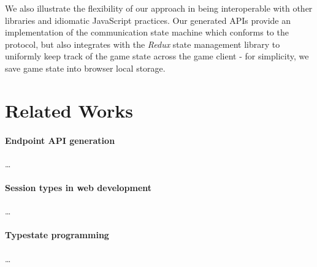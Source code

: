 \documentclass[submission,copyright,creativecommons]{eptcs}
\begin{document}
We also illustrate the flexibility of our approach in being interoperable with other libraries and idiomatic JavaScript practices. Our generated APIs provide an implementation of the communication state machine which conforms to the protocol, but \cite{NoughtsAndCrosses} also integrates with the \textit{Redux} state management library to uniformly keep track of the game state across the game client - for simplicity, we save game state into browser local storage.

\section{Related Works}

\paragraph{Endpoint API generation} \dots


\paragraph{Session types in web development} \dots

\paragraph{Typestate programming} \dots
\end{document}
